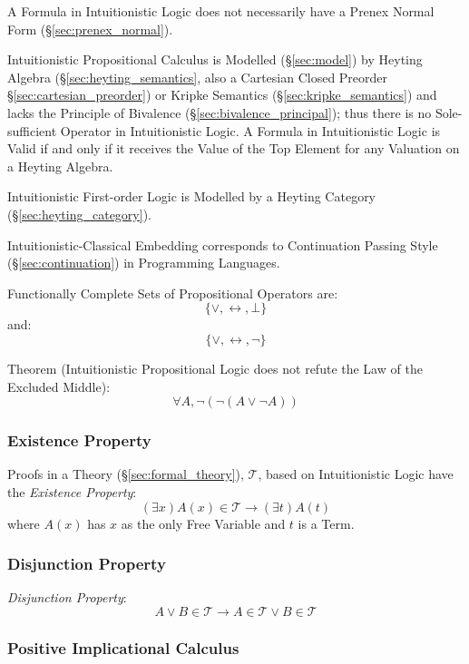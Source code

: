 A Formula in Intuitionistic Logic does not necessarily have a Prenex
Normal Form (\S\ref{sec:prenex_normal}).

Intuitionistic Propositional Calculus is Modelled (\S\ref{sec:model})
by Heyting Algebra (\S\ref{sec:heyting_semantics}, also a Cartesian
Closed Preorder \S\ref{sec:cartesian_preorder}) or Kripke Semantics
(\S\ref{sec:kripke_semantics}) and lacks the Principle of Bivalence
(\S\ref{sec:bivalence_principal}); thus there is no Sole-sufficient
Operator in Intuitionistic Logic. A Formula in Intuitionistic Logic is
Valid if and only if it receives the Value of the Top Element for any
Valuation on a Heyting Algebra.

Intuitionistic First-order Logic is Modelled by a Heyting Category
(\S\ref{sec:heyting_category}).

Intuitionistic-Classical Embedding corresponds to Continuation Passing
Style (\S\ref{sec:continuation}) in Programming Languages.

Functionally Complete Sets of Propositional Operators are:
\[
  \{ \vee, \leftrightarrow, \bot \}
\]
and:
\[
  \{ \vee, \leftrightarrow, \neg \}
\]

Theorem (Intuitionistic Propositional Logic does not refute the Law of
the Excluded Middle)\cite{harper12}:
\[
  \forall A, \neg (\neg (A \vee \neg A))
\]



\subsubsection{Existence Property}\label{sec:existence_property}

Proofs in a Theory (\S\ref{sec:formal_theory}), $\mathcal{T}$, based
on Intuitionistic Logic have the \emph{Existence Property}:
\[
  (\exists x)A(x) \in \mathcal{T} \rightarrow (\exists t)A(t)
\]
where $A(x)$ has $x$ as the only Free Variable and $t$ is a Term.



\subsubsection{Disjunction Property}\label{sec:disjunction_property}

\emph{Disjunction Property}:
\[
  A \vee B \in \mathcal{T}
  \rightarrow A \in \mathcal{T} \vee B \in \mathcal{T}
\]



\subsubsection{Positive Implicational Calculus}
\label{sec:positive_implicational}


